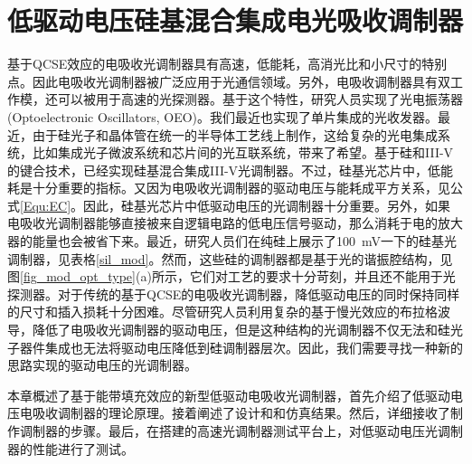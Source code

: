\chapter{低驱动电压硅基混合集成电光吸收调制器}
基于QCSE效应的电吸收光调制器具有高速，低能耗，高消光比和小尺寸的特别点\cite{tang2012energy, fukano2006very}。因此电吸收光调制器被广泛应用于光通信领域。另外，电吸收调制器具有双工作模，还可以被用于高速的光探测器\cite{welstand1996dual}。基于这个特性，研究人员实现了光电振荡器(Optoelectronic Oscillators, OEO)\cite{zhou2014compact}。我们最近也实现了单片集成的光收发器\cite{chen2016wavelength}。最近，由于硅光子和晶体管在统一的半导体工艺线上制作，这给复杂的光电集成系统，比如集成光子微波系统\cite{Marpaung2013integrated}和芯片间的光互联系统\cite{sun2015single}，带来了希望。基于硅和III-V的键合技术，已经实现硅基混合集成III-V光调制器\cite{kuo2008high,tang201150,tang2012over,tang2012energy,chen2011forty,Srinivasan2012micro,fu20155}。不过，硅基光芯片中，低能耗是十分重要的指标。又因为电吸收光调制器的驱动电压与能耗成平方关系，见公式\ref{Equ:EC}。因此，硅基光芯片中低驱动电压的光调制器十分重要。另外，如果电吸收光调制器能够直接被来自逻辑电路的低电压信号驱动，那么消耗于电的放大器的能量也会被省下来。最近，研究人员们在纯硅上展示了100~mV一下的硅基光调制器，见表格\ref{sil_mod}。然而，这些硅的调制器都是基于光的谐振腔结构，见图\ref{fig_mod_opt_type}(a)所示，它们对工艺的要求十分苛刻，并且还不能用于光探测器。对于传统的基于QCSE的电吸收光调制器，降低驱动电压的同时保持同样的尺寸和插入损耗十分困难。尽管研究人员利用复杂的基于慢光效应的布拉格波导\cite{gulow-voltage2013}，降低了电吸收光调制器的驱动电压，但是这种结构的光调制器不仅无法和硅光子器件集成也无法将驱动电压降低到硅调制器层次。因此，我们需要寻找一种新的思路实现的驱动电压的光调制器。

本章概述了基于能带填充效应的新型低驱动电吸收光调制器，首先介绍了低驱动电压电吸收调制器的理论原理。接着阐述了设计和和仿真结果。然后，详细接收了制作调制器的步骤。最后，在搭建的高速光调制器测试平台上，对低驱动电压光调制器的性能进行了测试。
